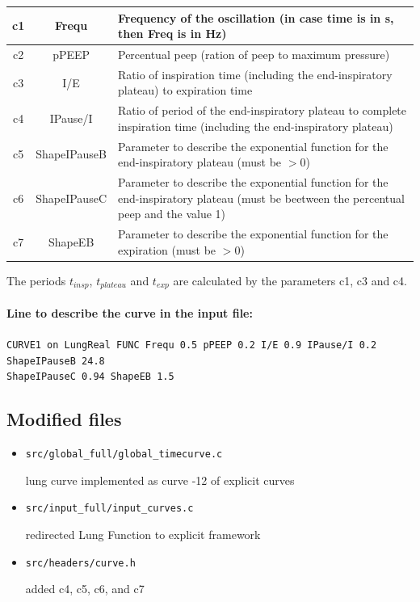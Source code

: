 \begin{tabular}{|c|c|p{125mm}|}
	\hline
	c1	& Frequ	& Frequency of the oscillation (in case time is in s, then Freq is in Hz) \\
	\hline
	c2	& pPEEP 	& Percentual peep (ration of peep to maximum pressure)\\
	\hline
	c3	& I/E 	& Ratio of inspiration time (including the end-inspiratory plateau) to expiration time \\
	\hline
	c4	& IPause/I 	& Ratio of period of the end-inspiratory plateau to complete inspiration time (including the end-inspiratory plateau)\\
	\hline
	c5	& ShapeIPauseB & Parameter to describe the exponential function for the end-inspiratory plateau (must be $>0$)\\
	\hline
	c6	& ShapeIPauseC & Parameter to describe the exponential function for the end-inspiratory plateau (must be beetween the percentual peep and the value 1)\\
	\hline
	c7	& ShapeEB 	& Parameter to describe the exponential function for the expiration (must be $>0$)\\
	\hline
\end{tabular}

\bigskip \par \noindent The periods $t_{insp}$, $t_{plateau}$ and $t_{exp}$ are calculated by the parameters c1, c3 and c4.

\paragraph*{Line to describe the curve in the input file:\\}
{\tt CURVE1 on LungReal FUNC Frequ 0.5 pPEEP 0.2 I/E 0.9 IPause/I 0.2 ShapeIPauseB 24.8 \\ ShapeIPauseC 0.94 ShapeEB 1.5}

\subsection*{Modified files}
\begin{itemize}
	\item {\tt src/global\_full/global\_timecurve.c}
	\par \noindent lung curve implemented as curve -12 of explicit curves

	\item {\tt src/input\_full/input\_curves.c}
	\par \noindent redirected Lung Function to explicit framework

	\item {\tt src/headers/curve.h}
	\par \noindent added c4, c5, c6, and c7
\end{itemize}